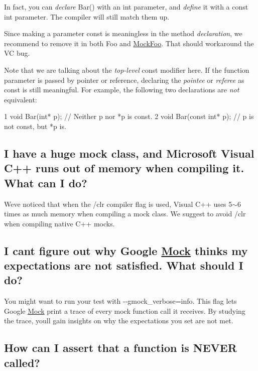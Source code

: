 In fact, you can {\itshape declare} Bar() with an {\ttfamily int} parameter, and {\itshape define} it with a {\ttfamily const int} parameter. The compiler will still match them up.

Since making a parameter {\ttfamily const} is meaningless in the method {\itshape declaration}, we recommend to remove it in both {\ttfamily Foo} and {\ttfamily \hyperlink{class_mock_foo}{Mock\+Foo}}. That should workaround the VC bug.

Note that we are talking about the {\itshape top-\/level} {\ttfamily const} modifier here. If the function parameter is passed by pointer or reference, declaring the {\itshape pointee} or {\itshape referee} as {\ttfamily const} is still meaningful. For example, the following two declarations are {\itshape not} equivalent\+: 
\begin{DoxyCode}
1 void Bar(int* p);        // Neither p nor *p is const.
2 void Bar(const int* p);  // p is not const, but *p is.
\end{DoxyCode}


\subsection*{I have a huge mock class, and Microsoft Visual C++ runs out of memory when compiling it. What can I do?}

We\textquotesingle{}ve noticed that when the {\ttfamily /clr} compiler flag is used, Visual C++ uses 5$\sim$6 times as much memory when compiling a mock class. We suggest to avoid {\ttfamily /clr} when compiling native C++ mocks.

\subsection*{I can\textquotesingle{}t figure out why Google \hyperlink{class_mock}{Mock} thinks my expectations are not satisfied. What should I do?}

You might want to run your test with {\ttfamily -\/-\/gmock\+\_\+verbose=info}. This flag lets Google \hyperlink{class_mock}{Mock} print a trace of every mock function call it receives. By studying the trace, you\textquotesingle{}ll gain insights on why the expectations you set are not met.

\subsection*{How can I assert that a function is N\+E\+V\+ER called?}


